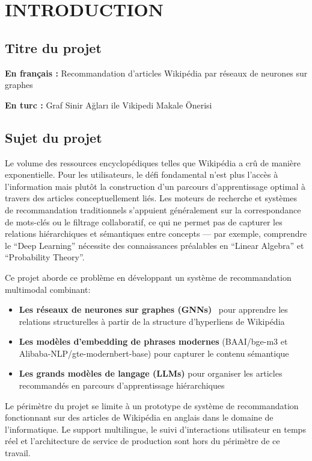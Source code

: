 \chapter{INTRODUCTION}
\thispagestyle{empty}

\section{Titre du projet}

\textbf{En français :} Recommandation d'articles Wikipédia par réseaux de neurones sur graphes

\textbf{En turc :} Graf Sinir Ağları ile Vikipedi Makale Önerisi

\section{Sujet du projet}

Le volume des ressources encyclopédiques telles que Wikipédia a crû de manière exponentielle. Pour les utilisateurs, le défi fondamental n'est plus l'accès à l'information mais plutôt la construction d'un parcours d'apprentissage optimal à travers des articles conceptuellement liés. Les moteurs de recherche et systèmes de recommandation traditionnels s'appuient généralement sur la correspondance de mots-clés ou le filtrage collaboratif, ce qui ne permet pas de capturer les relations hiérarchiques et sémantiques entre concepts --- par exemple, comprendre le ``Deep Learning'' nécessite des connaissances préalables en ``Linear Algebra'' et ``Probability Theory''.

Ce projet aborde ce problème en développant un système de recommandation multimodal combinant:
\begin{itemize}
    \item \textbf{Les réseaux de neurones sur graphes (GNNs)}~\cite{kipf2017semi,velickovic2018graph} pour apprendre les relations structurelles à partir de la structure d'hyperliens de Wikipédia
    \item \textbf{Les modèles d'embedding de phrases modernes} (BAAI/bge-m3 et Alibaba-NLP/gte-modernbert-base) pour capturer le contenu sémantique
    \item \textbf{Les grands modèles de langage (LLMs)} pour organiser les articles recommandés en parcours d'apprentissage hiérarchiques
\end{itemize}

Le périmètre du projet se limite à un prototype de système de recommandation fonctionnant sur des articles de Wikipédia en anglais dans le domaine de l'informatique. Le support multilingue, le suivi d'interactions utilisateur en temps réel et l'architecture de service de production sont hors du périmètre de ce travail.

